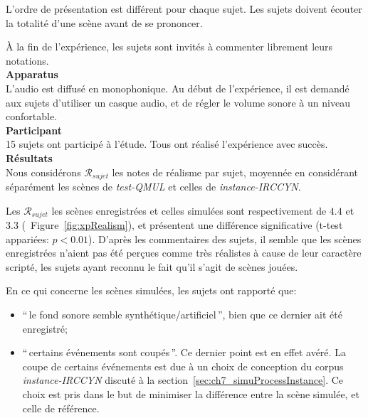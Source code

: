 L'ordre de présentation est différent pour chaque sujet. Les sujets doivent écouter la totalité d'une scène avant de se prononcer.

À la fin de l'expérience, les sujets sont invités à commenter librement leurs notations. \\

\textbf{Apparatus} \\

L'audio est diffusé en monophonique. Au début de l'expérience, il est demandé aux sujets d'utiliser un casque audio, et de régler le volume sonore à un niveau confortable.  \\

\textbf{Participant} \\

15 sujets ont participé à l'étude. Tous ont réalisé l'expérience avec succès. \\

\textbf{Résultats} \\

Nous considérons $\mathcal{R}_{sujet}$ les notes de réalisme par sujet, moyennée  en considérant séparément les scènes de \emph{test-QMUL} et celles de \emph{instance-IRCCYN}.

Les $\mathcal{R}_{sujet}$ les scènes enregistrées et celles simulées  sont respectivement de $4.4$ et $3.3$ (\cf~Figure~\ref{fig:xpRealism}), et présentent une différence significative (t-test appariées: $p<0.01$). D'après les commentaires des sujets, il semble que les scènes enregistrées n'aient pas été perçues comme très réalistes à cause de leur caractère scripté, les sujets ayant reconnu le fait qu'il s'agit de scènes jouées. 

En ce qui concerne les scènes simulées, les sujets ont rapporté que: 

\begin{itemize}
\item ``\,le fond sonore semble synthétique/artificiel\,'', bien que ce dernier ait été enregistré;
\item ``\,certains événements sont coupés\,''. Ce dernier point est en effet avéré. La coupe de certains événements est due à un choix de conception du corpus \emph{instance-IRCCYN} discuté à la section~\ref{sec:ch7_simuProcessInstance}. Ce choix est pris dans le but de minimiser la différence entre la scène simulée, et celle de référence. 
\end{itemize}

